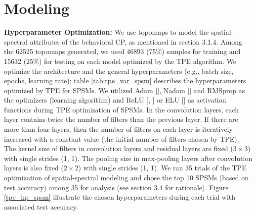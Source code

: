 \documentclass{article}
\begin{document}
\section{Modeling}

\textbf{Hyperparameter Optimization:} We use topomaps to model the spatial-spectral attributes of the behavioral CP, as mentioned in section 3.1.4. Among the 62525 topomaps generated, we used 46893 (75\%) samples for training and 15632 (25\%) for testing on each model optimized by the TPE algorithm. We optimize the architecture and the general hyperparameters (e.g., batch size, epochs, learning rate); table \ref{tab:tpe_var_spsm} describes the hyperparameters optimized by TPE for SPSMs. We utilized Adam [\cite{adam}], Nadam [\cite{nadam}] and RMSprop as the optimizers (learning algorithm) and ReLU [\cite{relu}, \cite{relu_2}] or ELU [\cite{elu}] as activation functions during TPE optimization of SPSMs. In the convolution layers, each layer contains twice the number of filters than the previous layer. If there are more than four layers, then the number of filters on each layer is iteratively increased with a constant value (the initial number of filters chosen by TPE). The kernel size of filters in convolution layers and residual layers are fixed ($3 \times 3$) with single strides (1, 1). The pooling size in max-pooling layers after convolution layers is also fixed ($2 \times 2$) with single strides (1, 1). We ran 35 trials of the TPE optimization of spatial-spectral modeling and chose the top 10 SPSMs (based on test accuracy) among 35 for analysis (see section 3.4 for rationale). Figure \ref{tpe_hp_spsm} illustrate the chosen hyperparameters during each trial with associated test accuracy.
\end{document}
